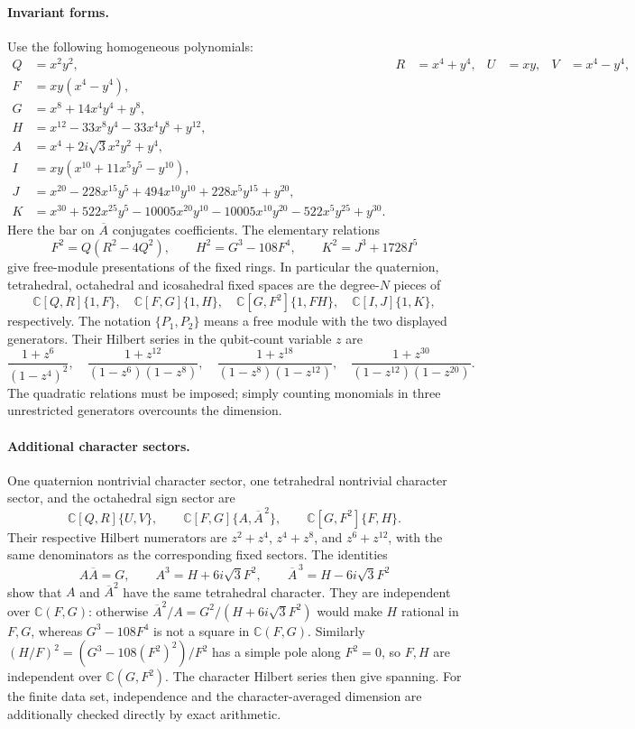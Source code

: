 \documentclass[11pt]{article}
\begin{document}
\paragraph{Invariant forms.}
Use the following homogeneous polynomials:
\begin{align*}
 Q&=x^2y^2,& R&=x^4+y^4,& U&=xy,& V&=x^4-y^4,\\
 F&=xy(x^4-y^4),\\
 G&=x^8+14x^4y^4+y^8,\\
 H&=x^{12}-33x^8y^4-33x^4y^8+y^{12},\\
 A&=x^4+2i\sqrt3x^2y^2+y^4,\\
 I&=xy(x^{10}+11x^5y^5-y^{10}),\\
 J&=x^{20}-228x^{15}y^5+494x^{10}y^{10}+228x^5y^{15}+y^{20},\\
 K&=x^{30}+522x^{25}y^5-10005x^{20}y^{10}
       -10005x^{10}y^{20}-522x^5y^{25}+y^{30}.
\end{align*}
Here the bar on $\overline A$ conjugates coefficients. The elementary
relations
\[
 F^2=Q(R^2-4Q^2),\qquad H^2=G^3-108F^4,
 \qquad K^2=J^3+1728I^5
\]
give free-module presentations of the fixed rings. In particular the
quaternion, tetrahedral, octahedral and icosahedral fixed spaces are the
degree-$N$ pieces of
\[
 \mathbb C[Q,R]\{1,F\},\quad
 \mathbb C[F,G]\{1,H\},\quad
 \mathbb C[G,F^2]\{1,FH\},\quad
 \mathbb C[I,J]\{1,K\},
\]
respectively. The notation $\{P_1,P_2\}$ means a free module with the two
displayed generators. Their Hilbert series in the qubit-count variable $z$
are
\[
 \frac{1+z^6}{(1-z^4)^2},\quad
 \frac{1+z^{12}}{(1-z^6)(1-z^8)},\quad
 \frac{1+z^{18}}{(1-z^8)(1-z^{12})},\quad
 \frac{1+z^{30}}{(1-z^{12})(1-z^{20})}.
\]
The quadratic relations must be imposed; simply counting monomials in three
unrestricted generators overcounts the dimension.

\paragraph{Additional character sectors.}
One quaternion nontrivial character sector, one tetrahedral nontrivial
character sector, and the octahedral sign sector are
\[
 \mathbb C[Q,R]\{U,V\},\qquad
 \mathbb C[F,G]\{A,\overline A^{\,2}\},\qquad
 \mathbb C[G,F^2]\{F,H\}.
\]
Their respective Hilbert numerators are $z^2+z^4$, $z^4+z^8$, and $z^6+z^{12}$,
with the same denominators as the corresponding fixed sectors. The identities
\[
 A\overline A=G,\qquad
 A^3=H+6i\sqrt3F^2,\qquad
 \overline A^{\,3}=H-6i\sqrt3F^2
\]
show that $A$ and $\overline A^2$ have the same tetrahedral character.
They are independent over $\mathbb C(F,G)$: otherwise
$\overline A^2/A=G^2/(H+6i\sqrt3F^2)$ would make $H$ rational in $F,G$,
whereas $G^3-108F^4$ is not a square in $\mathbb C(F,G)$.
Similarly $(H/F)^2=(G^3-108(F^2)^2)/F^2$ has a simple pole along $F^2=0$,
so $F,H$ are independent over $\mathbb C(G,F^2)$.
The character Hilbert series then give spanning. For the finite data set,
independence and the character-averaged dimension are additionally checked
directly by exact arithmetic.
\end{document}
